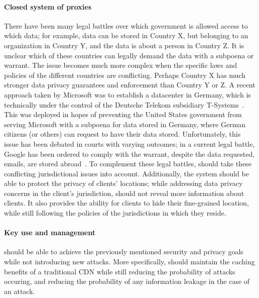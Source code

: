 \paragraph{Closed system of proxies} There have been many legal battles over which government is allowed access 
to which data; for example, data can be stored in Country X, but belonging to an organization in Country Y, and 
the data is about a person in Country Z.  It is unclear which of these countries can legally demand 
the data with a subpoena or warrant.  The issue becomes much more complex when the specific laws 
and policies of the different countries are conflicting.  Perhaps Country X has much stronger data privacy 
guarantees and enforcement than Country Y or Z.  A recent approach taken by Microsoft was to establish 
a datacenter in Germany, which is technically under the control of the Deutsche Telekom subsidiary 
T-Systems~\cite{microsoft_germany}.  This was deployed in hopes of preventing the United States government from serving Microsoft with a subpoena 
for data stored in Germany, where German citizens (or others) can request to have their data stored.  Unfortunately, this issue has 
been debated in courts with varying outcomes; in a current legal battle, Google 
has been ordered to comply with the warrant, despite the data requested, emails, are stored abroad~\cite{google_warrant}.
  To complement these legal battles, \system{} should take 
these conflicting jurisdictional issues into account.  Additionally, the system should be able to protect 
the privacy of clients' locations; while addressing data privacy concerns in the client's jurisdiction, \system{} 
should not reveal more information about clients.  It also provides the ability for clients 
to hide their fine-grained location, while still following the policies of the jurisdictions in which 
they reside.

\paragraph{Key use and management} \system{} should be able to achieve the previously mentioned security 
and privacy goals while not introducing new attacks.  More specifically, \system{} should maintain the 
caching benefits of a traditional CDN while still reducing 
the probability of attacks occuring, and reducing the probability of any information leakage in 
the case of an attack.



